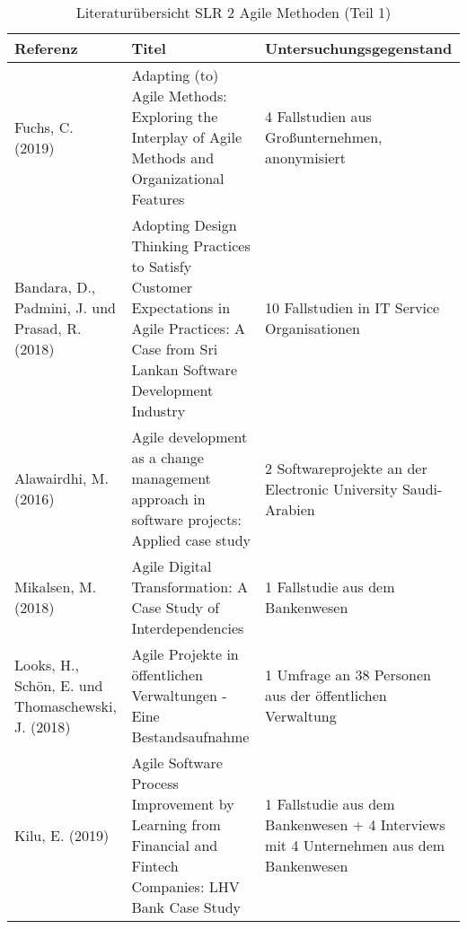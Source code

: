 \begin{table}[ht]
	\caption{Literaturübersicht SLR 2 Agile Methoden (Teil 1)}
	\centering
	\begin{tabularx}{500px}{|X|X|X|}
		\hline
		\textbf{Referenz}                                            & \textbf{Titel}                                                                                                                                                                   & \textbf{Untersuchungsgegenstand}                                                                                                                                         \\
		\hline
		Fuchs, C. (2019)                                    & Adapting (to) Agile Methods: Exploring the Interplay of Agile Methods and Organizational Features                                             & 4 Fallstudien aus Großunternehmen, anonymisiert                                                             \\
		Bandara, D., Padmini, J. und Prasad, R. (2018)      & Adopting Design Thinking Practices to Satisfy Customer Expectations in Agile Practices: A Case from Sri Lankan Software Development Industry  & 10 Fallstudien in IT Service Organisationen                                                                 \\
		Alawairdhi, M. (2016)                               & Agile development as a change management approach in software projects: Applied case study                                                    & 2 Softwareprojekte an der Electronic University Saudi-Arabien                                               \\
		Mikalsen, M. (2018)                                 & Agile Digital Transformation: A Case Study of Interdependencies                                                                               & 1 Fallstudie aus dem Bankenwesen                                                                            \\
		Looks, H., Schön, E. und Thomaschewski, J. (2018)   & Agile Projekte in öffentlichen Verwaltungen - Eine Bestandsaufnahme                                                                           & 1 Umfrage an 38 Personen aus der öffentlichen Verwaltung                                                    \\
		Kilu, E. (2019)                                     & Agile Software Process Improvement by Learning from Financial and Fintech Companies: LHV Bank Case Study                                      & 1 Fallstudie aus dem Bankenwesen + 4 Interviews mit 4 Unternehmen aus dem Bankenwesen                       \\

\end{tabularx}
\end{table}

